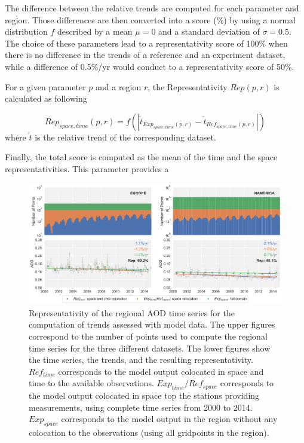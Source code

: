 \documentclass[journal abbreviation, manuscript]{copernicus}
\begin{document}
The difference between the relative trends are computed for each parameter and region. Those differences are then converted into a score (\unit{\%}) by using a normal distribution $f$ described by a mean $\mu=0$ and a standard deviation of $\sigma=0.5$. The choice of these parameters lead to a representativity score of 100\% 
when there is no difference in the trends of a reference and an experiment dataset, while a difference of 0.5\%/yr would conduct to a representativity score of 50\%.

For a given parameter $p$ and a region $r$, the Representativity $Rep(p,r)$ is calculated as following

\begin{equation}
 Rep_{space,time}(p, r) = {f\left(\left| \tilde{t}_{Exp_{space,time}(p, r)}-\tilde{t}_{Ref_{space,time}(p, r)} \right|\right)}
\end{equation}
where $\tilde{t}$ is the relative trend of the corresponding dataset.

Finally, the total score is computed as the mean of the time and the space representativities. This parameter provides a 

\begin{figure}[t]
 \includegraphics[width=16cm]{../scripts/figs/representativity-od550aer.png}
 \caption{Representativity of the regional AOD time series for the computation of trends assessed with model data. The upper figures correspond to the number of points used to compute the regional time series for the three different datasets. The lower figures show the time series, the trends, and the resulting representativity. $Ref_{time}$ corresponds to the model output colocated in space and time to the available observations. $Exp_{time}/Ref_{space}$ corresponds to the model output colocated in space top the stations providing measurements, using complete time series from 2000 to 2014. $Exp_{space}$ corresponds to the model output in the region without any colocation to the observations (using all gridpoints in the region).}
 \label{fig:representativity}
\end{figure}
\end{document}
